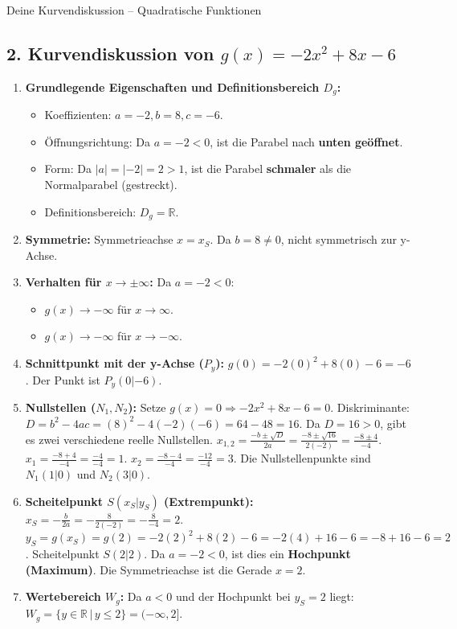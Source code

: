 \begin{loesungsumgebung}{Deine Kurvendiskussion – Quadratische Funktionen}
\subsection*{2. Kurvendiskussion von $g(x) = -2x^2 + 8x - 6$}
\begin{enumerate}[label=(\alph*)]
    \item \textbf{Grundlegende Eigenschaften und Definitionsbereich $D_g$:}
    \begin{itemize}
        \item Koeffizienten: $a=-2, b=8, c=-6$.
        \item Öffnungsrichtung: Da $a=-2 < 0$, ist die Parabel nach \textbf{unten geöffnet}.
        \item Form: Da $|a|=|-2|=2 > 1$, ist die Parabel \textbf{schmaler} als die Normalparabel (gestreckt).
        \item Definitionsbereich: $D_g = \mathbb{R}$.
    \end{itemize}
    \item \textbf{Symmetrie:}
    Symmetrieachse $x = x_S$. Da $b=8 \neq 0$, nicht symmetrisch zur y-Achse.
    \item \textbf{Verhalten für $x \to \pm \infty$:}
    Da $a=-2 < 0$:
    \begin{itemize}
        \item $g(x) \to -\infty$ für $x \to \infty$.
        \item $g(x) \to -\infty$ für $x \to -\infty$.
    \end{itemize}
    \item \textbf{Schnittpunkt mit der y-Achse ($P_y$):}
    $g(0) = -2(0)^2 + 8(0) - 6 = -6$. Der Punkt ist $P_y(0|-6)$.
    \item \textbf{Nullstellen ($N_1, N_2$):}
    Setze $g(x)=0 \Rightarrow -2x^2 + 8x - 6 = 0$.
    Diskriminante: $D = b^2 - 4ac = (8)^2 - 4(-2)(-6) = 64 - 48 = 16$.
    Da $D=16 > 0$, gibt es zwei verschiedene reelle Nullstellen.
    $x_{1,2} = \frac{-b \pm \sqrt{D}}{2a} = \frac{-8 \pm \sqrt{16}}{2(-2)} = \frac{-8 \pm 4}{-4}$.
    $x_1 = \frac{-8+4}{-4} = \frac{-4}{-4} = 1$.
    $x_2 = \frac{-8-4}{-4} = \frac{-12}{-4} = 3$.
    Die Nullstellenpunkte sind $N_1(1|0)$ und $N_2(3|0)$.
    \item \textbf{Scheitelpunkt $S(x_S|y_S)$ (Extrempunkt):}
    $x_S = -\frac{b}{2a} = -\frac{8}{2(-2)} = -\frac{8}{-4} = 2$.
    $y_S = g(x_S) = g(2) = -2(2)^2 + 8(2) - 6 = -2(4) + 16 - 6 = -8 + 16 - 6 = 2$.
    Scheitelpunkt $S(2|2)$. Da $a=-2 < 0$, ist dies ein \textbf{Hochpunkt (Maximum)}.
    Die Symmetrieachse ist die Gerade $x=2$.
    \item \textbf{Wertebereich $W_g$:}
    Da $a<0$ und der Hochpunkt bei $y_S=2$ liegt: $W_g = \{ y \in \mathbb{R} \,|\, y \le 2 \} = (-\infty, 2]$.
\end{enumerate}


\end{loesungsumgebung}
